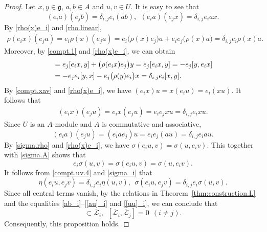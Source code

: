 \documentclass[12pt]{article}
\numberwithin{equation}{section}
\theoremstyle{definition}
\theoremstyle{plain}
\newcommand{\fg}{\mathfrak{g}}
\newcommand{\cL}{\ensuremath{\mathcal{L}}}
\begin{document}
\begin{proof}
    Let $x,y\in\fg$, $a,b\in A$ and $u,v\in U$. It is easy to see that
    \begin{equation}\label{ab_i}
        (e_i  a) (e_j  b)=\delta_{i,j}e_i  (a  b),\ \ (e_i  a)(e_jx)=\delta_{i,j}e_iax.
    \end{equation} 
    By \eqref{rho(x)e_i} and \eqref{rho.linear},
    \begin{align}\label{rho_i}
        \rho(e_ix)(e_ja)=e_i\rho(x)(e_ja)=e_i\big(\rho(x)e_j\big)a+e_ie_j\big(\rho(x)a\big)=\delta_{i,j}e_i\rho(x)a.
    \end{align}
    Moreover, by \eqref{compt.1} and \eqref{rho(x)e_i}, we can obtain
    \begin{align}
        [e_ix,e_jy]&=e_j[e_ix,y]+\big(\rho(e_ix)e_j\big)y=e_j[e_ix,y]=-e_j[y,e_ix]\notag\\
        &=-e_je_i[y,x]-e_j\big(\rho(y)e_i\big)x=\delta_{i,j}e_i[x,y]\label{[xy]_i}.
    \end{align}
    By \eqref{compt.xav} and \eqref{rho(x)e_i}, we have $(e_ix)u=x(e_iu)=e_i(xu)$. It follows that
    \begin{align}\label{[xu]_i}
        (e_ix)(e_ju)=e_ix(e_ju)=e_ie_jxu=\delta_{i,j}e_ixu.
    \end{align}
    Since $U$ is an $A$-module and $A$ is commutative and associative, 
    \begin{equation}\label{[au]_i}
        (e_ia)(e_ju)=(e_iae_j)u=e_ie_j(au)=\delta_{i,j}e_iau.
    \end{equation}
    By \eqref{sigma.rho} and \eqref{rho(x)e_i}, we have $\sigma(e_iu,v)=\sigma(u,e_iv)$. This together with \eqref{sigma.A} shows that 
    \begin{equation}\label{sigma_i}
        e_i \sigma(u,v)=\sigma(e_iu,v)=\sigma(u,e_iv).
    \end{equation}
    It follows from \eqref{compt.uv.4} and \eqref{sigma_i} that
    \begin{equation}\label{[uu]_i}
        \eta(e_iu,e_jv)=\delta_{i,j}e_i\eta(u,v),\ \ \sigma(e_iu,e_jv)=\delta_{i,j}e_i\sigma(u,v).
    \end{equation}
    Since all central terms vanish, by the relations in Theorem~\ref{thm:construction.L} and the equalities \eqref{ab_i}--\eqref{[au]_i} and \eqref{[uu]_i}, we can conclude that
    \begin{equation*}
        [\overline{\cL}_i,\overline{\cL}_i]\subset \overline{\cL}_i,\ \ [\overline{\cL}_i,\overline{\cL}_j]=0\ \ (i\neq j).
    \end{equation*}
    Consequently, this proposition holds.
\end{proof}
\end{document}

